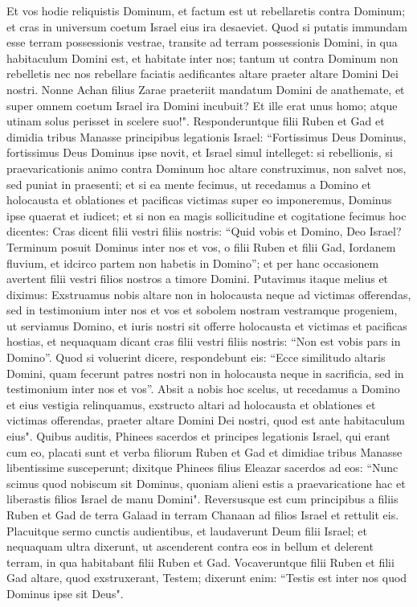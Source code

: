 \begin{biblechapter}
\verse Et vos hodie reliquistis Dominum, et factum est ut rebellaretis contra Dominum; et cras in universum coetum Israel eius ira desaeviet. 
\verse Quod si putatis immundam esse terram possessionis vestrae, transite ad terram possessionis Domini, in qua habitaculum Domini est, et habitate inter nos; tantum ut contra Dominum non rebelletis nec nos rebellare faciatis aedificantes altare praeter altare Domini Dei nostri. 
\verse Nonne Achan filius Zarae praeteriit mandatum Domini de anathemate, et super omnem coetum Israel ira Domini incubuit? Et ille erat unus homo; atque utinam solus perisset in scelere suo!". 
\verse Responderuntque filii Ruben et Gad et dimidia tribus Manasse principibus legationis Israel: 
\verse “Fortissimus Deus Dominus, fortissimus Deus Dominus ipse novit, et Israel simul intelleget: si rebellionis, si praevaricationis animo contra Dominum hoc altare construximus, non salvet nos, sed puniat in praesenti; 
\verse et si ea mente fecimus, ut recedamus a Domino et holocausta et oblationes et pacificas victimas super eo imponeremus, Dominus ipse quaerat et iudicet; 
\verse et si non ea magis sollicitudine et cogitatione fecimus hoc dicentes: Cras dicent filii vestri filiis nostris: “Quid vobis et Domino, Deo Israel? 
\verse Terminum posuit Dominus inter nos et vos, o filii Ruben et filii Gad, Iordanem fluvium, et idcirco partem non habetis in Domino”; et per hanc occasionem avertent filii vestri filios nostros a timore Domini. Putavimus itaque melius 
\verse et diximus: Exstruamus nobis altare non in holocausta neque ad victimas offerendas, 
\verse sed in testimonium inter nos et vos et sobolem nostram vestramque progeniem, ut serviamus Domino, et iuris nostri sit offerre holocausta et victimas et pacificas hostias, et nequaquam dicant cras filii vestri filiis nostris: “Non est vobis pars in Domino”. 
\verse Quod si voluerint dicere, respondebunt eis: “Ecce similitudo altaris Domini, quam fecerunt patres nostri non in holocausta neque in sacrificia, sed in testimonium inter nos et vos”. 
\verse Absit a nobis hoc scelus, ut recedamus a Domino et eius vestigia relinquamus, exstructo altari ad holocausta et oblationes et victimas offerendas, praeter altare Domini Dei nostri, quod est ante habitaculum eius". 
\verse Quibus auditis, Phinees sacerdos et principes legationis Israel, qui erant cum eo, placati sunt et verba filiorum Ruben et Gad et dimidiae tribus Manasse libentissime susceperunt; 
\verse dixitque Phinees filius Eleazar sacerdos ad eos: “Nunc scimus quod nobiscum sit Dominus, quoniam alieni estis a praevaricatione hac et liberastis filios Israel de manu Domini". 
\verse Reversusque est cum principibus a filiis Ruben et Gad de terra Galaad in terram Chanaan ad filios Israel et rettulit eis. 
\verse Placuitque sermo cunctis audientibus, et laudaverunt Deum filii Israel; et nequaquam ultra dixerunt, ut ascenderent contra eos in bellum et delerent terram, in qua habitabant filii Ruben et Gad. 
\verse Vocaveruntque filii Ruben et filii Gad altare, quod exstruxerant, Testem; dixerunt enim: “Testis est inter nos quod Dominus ipse sit Deus". 
\end{biblechapter}

